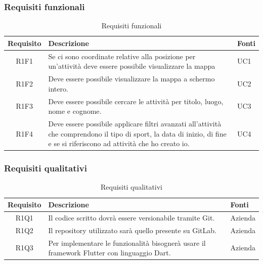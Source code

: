 \subsubsection{Requisiti funzionali}

\begin{center}
	\begin{table}[h!]
		
		\label{tab:Requisiti funzionali}
		\begin{tabularx}{\textwidth}{|c|p{8cm}|p{2.1cm}|}
			
			\hline
			\textbf{Requisito} & \centering\textbf{Descrizione} & \textbf{Fonti}  \\\hline
			
			R1F1 & Se ci sono coordinate relative alla posizione per un'attività deve essere possibile visualizzare la mappa  & UC1\\
			\hline	
			R1F2 &Deve essere possibile visualizzare la mappa a schermo intero. & UC2\\
			\hline
			R1F3& Deve essere possibile cercare le attività per titolo, luogo, nome e cognome.	& UC3	\\
			\hline	
			R1F4& Deve essere possibile applicare filtri avanzati all'attività che comprendono il tipo di sport, la data di inizio, di fine e se si riferiscono ad attività che ho creato io.	& UC4	\\
			\hline		
		\end{tabularx}
		\vspace{0.3cm}
		\caption{Requisiti funzionali}
	\end{table}
\end{center}

\newpage

\subsubsection{Requisiti qualitativi}

\begin{center}
	\begin{table}[h!]
		
		\label{tab:Requisiti qualitativi}
		\begin{tabularx}{\textwidth}{|c|p{8cm}|p{2.1cm}|}
			
			\hline
			\textbf{Requisito} & \centering\textbf{Descrizione} & \textbf{Fonti}  \\\hline
			
			R1Q1 &Il codice scritto dovrà essere versionabile tramite Git.  & Azienda\\
			\hline	
			R1Q2 &Il repository utilizzato sarà quello presente su GitLab. & Azienda\\
			\hline
			R1Q3& Per implementare le funzionalità bisognerà usare il framework Flutter con linguaggio Dart.	& Azienda	\\
			\hline		
		\end{tabularx}
		\vspace{0.3cm}
		\caption{Requisiti qualitativi}
	\end{table}
\end{center}

